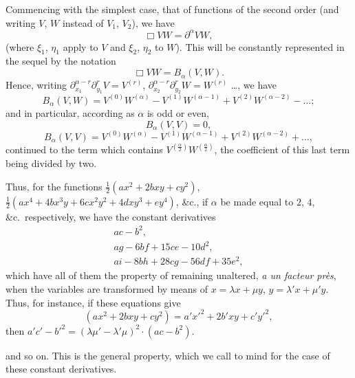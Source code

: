 \documentclass[11pt,a4paper]{book}
\begin{document}
Commencing with the simplest case, that of functions of the second order (and
writing $V$, $W$ instead of $V_1$, $V_2$), we have
\[
\Box VW = \partial^{\alpha} VW,
\]
(where $\xi_1$, $\eta_1$ apply to $V$ and $\xi_2$, $\eta_2$ to $W$). This will be constantly represented in
the sequel by the notation
\[
\Box VW = B_{\alpha}(V, W).
\]
Hence, writing $\partial_{x_1}^{\alpha-r} \partial_{y_1}^r V = V^{(r)}$, $\partial_{x_2}^{\alpha-r} \partial_{y_2}^r W = W^{(r)}$ \ldots,
we have
\[
B_{\alpha}(V, W) = V^{(0)} W^{(\alpha)} - V^{(1)} W^{(\alpha-1)} + V^{(2)} W^{(\alpha-2)} - \ldots;
\]
and in particular, according as $\alpha$ is odd or even,
\[
B_{\alpha}(V, V) = 0,
\]
\[
B_{\alpha}(V, V) = V^{(0)} W^{(\alpha)} - V^{(1)} W^{(\alpha-1)} + V^{(2)} W^{(\alpha-2)} + \ldots,
\]
continued to the term which contains $V^{(\frac{\alpha}{2})} W^{(\frac{\alpha}{2})}$, the coefficient of this last term
being divided by two.

Thus, for the functions $\tfrac{1}{2}(ax^2 + 2bxy + cy^2)$, $\tfrac{1}{2}(ax^4 + 4bx^3y + 6cx^2y^2 + 4dxy^3 + ey^4)$, \&c.,
if $\alpha$ be made equal to $2$, $4$, \&c.\ respectively, we have the constant derivatives
\begin{align*}
ac - b^2, \\
ag - 6bf + 15ce - 10d^2, \\
ai - 8bh + 28cg - 56df + 35e^2,
\end{align*}
which have all of them the property of remaining unaltered, \textit{a un facteur pr\`{e}s}, when
the variables are transformed by means of $x = \lambda x + \mu y$, $y = \lambda' x + \mu' y$. Thus, for instance,
if these equations give
\[
(ax^2 + 2bxy + cy^2) = a'x'^2 + 2b'xy + c'y'^2,
\]
then $a'c' - b'^2 = (\lambda\mu' - \lambda'\mu)^2 \cdot (ac - b^2)$.

and so on. This is the general property, which we call to mind for the case of these
constant derivatives.
\end{document}

